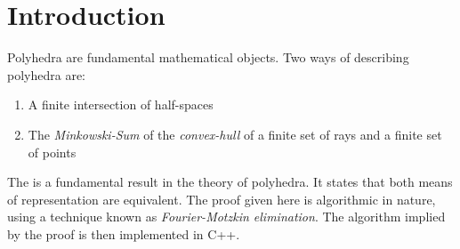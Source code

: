 \chapter*{Introduction}

Polyhedra are fundamental mathematical objects.  Two ways of describing polyhedra are:
\begin{enumerate}
  \item A finite intersection of half-spaces
  \item The \textit{Minkowski-Sum} of the \textit{convex-hull} of a finite set of rays and a finite set of points
\end{enumerate}
The {\MWT} is a fundamental result in the theory of polyhedra.  It states that both means of representation are equivalent.  The proof given here is algorithmic in nature, using a technique known as \textit{Fourier-Motzkin elimination}.  The algorithm implied by the proof is then implemented in C++.
